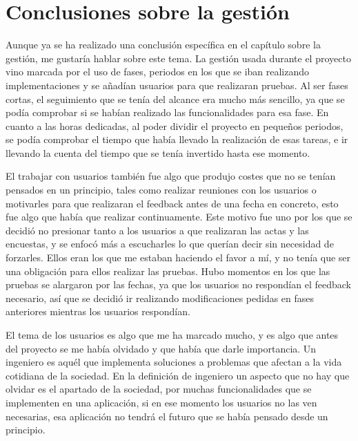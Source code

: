 \section{Conclusiones sobre la gestión}
\label{secc:Conclusiones sobre la gestión}

Aunque ya se ha realizado una conclusión específica en el capítulo sobre la gestión, me gustaría hablar sobre este tema. La gestión usada durante el proyecto vino marcada por el uso de fases, periodos en los que se iban realizando implementaciones y se añadían usuarios para que realizaran pruebas. Al ser fases cortas, el seguimiento que se tenía del alcance era mucho más sencillo, ya que se podía comprobar si se habían realizado las funcionalidades para esa fase. En cuanto a las horas dedicadas, al poder dividir el proyecto en pequeños periodos, se podía comprobar el tiempo que había llevado la realización de esas tareas, e ir llevando la cuenta del tiempo que se tenía invertido hasta ese momento. 

El trabajar con usuarios también fue algo que produjo costes que no se tenían pensados en un principio, tales como realizar reuniones con los usuarios o motivarles para que realizaran el feedback antes de una fecha en concreto, esto fue algo que había que realizar continuamente. Este motivo fue uno por los que se decidió no presionar tanto a los usuarios a que realizaran las actas y las encuestas, y se enfocó más a escucharles lo que querían decir sin necesidad de forzarles. Ellos eran los que me estaban haciendo el favor a mí, y no tenía que ser una obligación para ellos realizar las pruebas. Hubo momentos en los que las pruebas se alargaron por las fechas, ya que los usuarios no respondían el feedback necesario, así que se decidió ir realizando modificaciones pedidas en fases anteriores mientras los usuarios respondían.

El tema de los usuarios es algo que me ha marcado mucho, y es algo que antes del proyecto se me había olvidado y que había que darle importancia. Un ingeniero es aquél que implementa soluciones a problemas que afectan a la vida cotidiana de la sociedad. En la definición de ingeniero un aspecto que no hay que olvidar es el apartado de la sociedad, por muchas funcionalidades que se implementen en una aplicación, si en ese momento los usuarios no las ven necesarias, esa aplicación no tendrá el futuro que se había pensado desde un principio.


